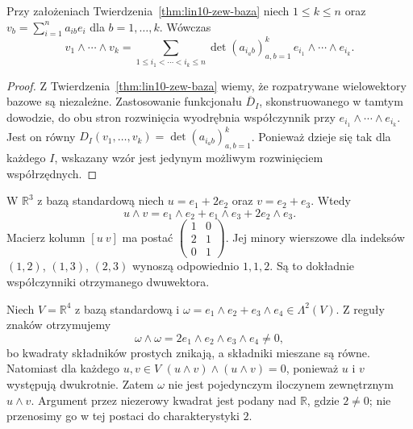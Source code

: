 \begin{wniosek}
\label{cor:lin10-wedge-minory}
Przy założeniach
Twierdzenia~\ref{thm:lin10-zew-baza}
niech \(1\leq k\leq n\)
oraz
\(v_b=\sum_{i=1}^n a_{ib}e_i\)
dla \(b=1,\ldots,k\).
Wówczas
\[
 v_1\wedge\cdots\wedge v_k
 =\sum_{1\leq i_1<\cdots<i_k\leq n}
   \det(a_{i_a b})_{a,b=1}^k\,
   e_{i_1}\wedge\cdots\wedge e_{i_k}.
\]
\end{wniosek}
\begin{proof}
Z
Twierdzenia~\ref{thm:lin10-zew-baza}
wiemy, że rozpatrywane
wielowektory bazowe są niezależne.
Zastosowanie funkcjonału
\(\overline D_I\), skonstruowanego
w tamtym dowodzie, do obu stron
rozwinięcia wyodrębnia współczynnik
przy \(e_{i_1}\wedge\cdots\wedge e_{i_k}\).
Jest on równy
\(D_I(v_1,\ldots,v_k)
=\det(a_{i_a b})_{a,b=1}^k\).
Ponieważ dzieje się tak dla
każdego \(I\), wskazany wzór
jest jedynym możliwym
rozwinięciem współrzędnych.
\end{proof}

\begin{przyklad}
\label{prz:lin10-dwuwektor}
W \(\mathbb R^3\) z bazą
standardową niech
\(u=e_1+2e_2\) oraz
\(v=e_2+e_3\).
Wtedy
\[
 u\wedge v
 =e_1\wedge e_2+
  e_1\wedge e_3+
  2e_2\wedge e_3.
\]
Macierz kolumn \([u\ v]\)
ma postać
\(\begin{pmatrix}1&0\\2&1\\0&1\end{pmatrix}\).
Jej minory wierszowe
dla indeksów \((1,2)\),
\((1,3)\), \((2,3)\)
wynoszą odpowiednio
\(1,1,2\). Są to dokładnie
współczynniki otrzymanego
dwuwektora.
\end{przyklad}

\begin{przyklad}
\label{prz:lin10-nieprosty}
Niech \(V=\mathbb R^4\)
z bazą standardową i
\(\omega=e_1\wedge e_2+
e_3\wedge e_4\in\Lambda^2(V)\).
Z reguły znaków otrzymujemy
\[
 \omega\wedge\omega
 =2e_1\wedge e_2\wedge e_3\wedge e_4
 \ne0,
\]
bo kwadraty składników prostych
znikają, a składniki mieszane
są równe. Natomiast dla
każdego \(u,v\in V\)
\((u\wedge v)\wedge(u\wedge v)=0\),
ponieważ \(u\) i \(v\)
występują dwukrotnie.
Zatem \(\omega\) nie jest
pojedynczym iloczynem
zewnętrznym \(u\wedge v\).
Argument przez niezerowy
kwadrat jest podany nad
\(\mathbb R\), gdzie \(2\ne0\);
nie przenosimy go w tej
postaci do charakterystyki \(2\).
\end{przyklad}


